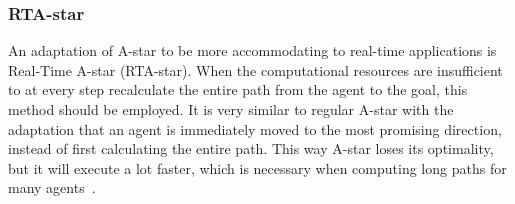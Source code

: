 			\subsubsection{RTA-star}
				An adaptation of A-star to be more accommodating to real-time applications is Real-Time A-star (RTA-star). When the computational resources are insufficient to at every step recalculate the entire path from the agent to the goal, this method should be employed. It is very similar to regular A-star with the adaptation that an agent is immediately moved to the most promising direction, instead of first calculating the entire path. This way A-star loses its optimality, but it will execute a lot faster, which is necessary when computing long paths for many agents~\cite{korf1990real}.
